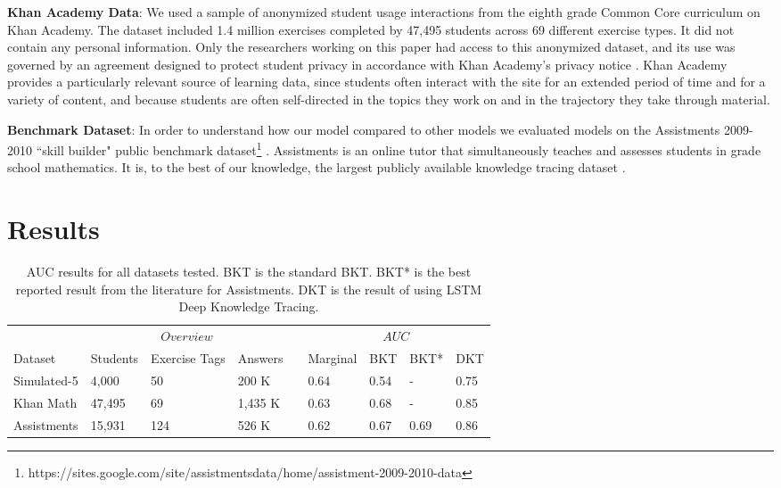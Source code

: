 \textbf{Khan Academy Data}: We used a sample of anonymized student usage interactions from the eighth grade Common Core curriculum on Khan Academy. The dataset included 1.4 million exercises completed by 47,495 students across 69 different exercise types. 
It did not contain any personal information. Only the researchers working on this paper had access to this anonymized dataset, and  its use was governed by an agreement designed to protect student privacy in accordance with Khan Academy's privacy notice \cite{KAprivacy}. 
Khan Academy provides a particularly relevant source of learning data, since students often interact with the site for an extended period of time and for a variety of content, and because students are often self-directed in the topics they work on and in the trajectory they take through material.

\textbf{Benchmark Dataset}: In order to understand how our model compared to other models we evaluated models on the Assistments 2009-2010 ``skill builder" public benchmark dataset\footnote{https://sites.google.com/site/assistmentsdata/home/assistment-2009-2010-data}
. Assistments is an online tutor that simultaneously teaches and assesses students in grade school mathematics. It is, to the best of our knowledge, the largest publicly available knowledge tracing dataset \cite{feng2009addressing}. 

\section{Results}\label{sec results}

\begin{table}\centering
{}
\begin{tabular}{@{}llllcllll@{}}
\toprule
& \multicolumn{3}{c}{$Overview$} & \phantom{abc} &
 \multicolumn{4}{c}{$AUC$} \\
\cmidrule{2-4} 
\cmidrule{6-9}  
Dataset & Students & Exercise Tags & Answers && Marginal & BKT & BKT* & DKT \\ 
\midrule
Simulated-5 & 4,000 & 50 & 200 K && 0.64 & 0.54 & - & 0.75 \\
Khan Math  & 47,495 & 69 & 1,435 K && 0.63 & 0.68 & - & 0.85 \\
Assistments & 15,931 & 124 & 526 K && 0.62 & 0.67 & 0.69 & 0.86 \\
\bottomrule
\end{tabular}
\caption[Knowledge tracing accuracy]{AUC results for all datasets tested. BKT is the standard BKT. BKT* is the best reported result from the literature for Assistments. DKT is the result of using LSTM Deep Knowledge Tracing.
\label{table:results}
}

\end{table}

